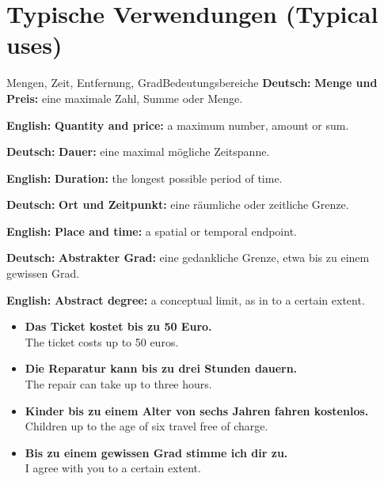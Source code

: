 \documentclass[a4paper,11pt]{article}
\newcommand{\GermanText}[1]{\textbf{Deutsch: }#1\par}
\newcommand{\EnglishText}[1]{{\small\color{SoftGray}\textbf{English: }#1\par}}
\newcommand{\ExampleItem}[2]{\item \textbf{#1}\\{\small\color{SoftGray}#2}}
\begin{document}
   \section{Typische Verwendungen (Typical uses)}
      \begin{grammarentry}{Mengen, Zeit, Entfernung, Grad}{Bedeutungsbereiche}
         \GermanText{\textbf{Menge und Preis:} eine maximale Zahl, Summe oder Menge.}
         \EnglishText{\textbf{Quantity and price:} a maximum number, amount or sum.}
         \GermanText{\textbf{Dauer:} eine maximal mögliche Zeitspanne.}
         \EnglishText{\textbf{Duration:} the longest possible period of time.}
         \GermanText{\textbf{Ort und Zeitpunkt:} eine räumliche oder zeitliche Grenze.}
         \EnglishText{\textbf{Place and time:} a spatial or temporal endpoint.}
         \GermanText{\textbf{Abstrakter Grad:} eine gedankliche Grenze, etwa \glqq bis zu einem gewissen Grad\grqq.}
         \EnglishText{\textbf{Abstract degree:} a conceptual limit, as in to a certain extent.}
      \end{grammarentry}
      \begin{exbox}
         \begin{itemize}
            \ExampleItem{Das Ticket kostet bis zu 50 Euro.}{The ticket costs up to 50 euros.}
            \ExampleItem{Die Reparatur kann bis zu drei Stunden dauern.}{The repair can take up to three hours.}
            \ExampleItem{Kinder bis zu einem Alter von sechs Jahren fahren kostenlos.}{Children up to the age of six travel free of charge.}
            \ExampleItem{Bis zu einem gewissen Grad stimme ich dir zu.}{I agree with you to a certain extent.}
         \end{itemize}
      \end{exbox}
\end{document}
